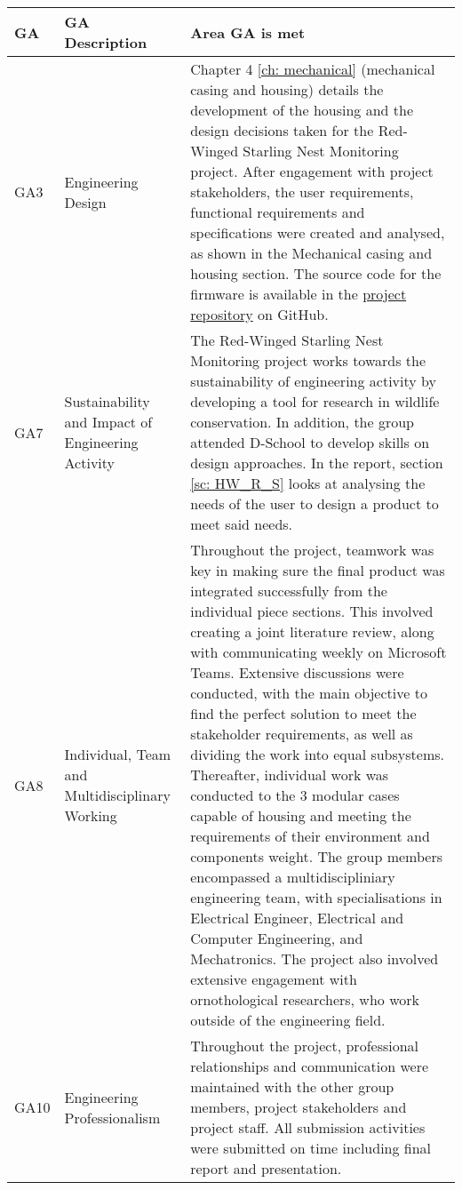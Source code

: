\documentclass[class=report,11pt,crop=false]{standalone}
\begin{document}
\centering
\begin{tabularx}{\textwidth}{|p{} p{} X|}

    \hline
    \textbf{GA} & \textbf{GA Description} & \textbf{Area GA is met} \\ \hline

    GA3 & Engineering Design & Chapter 4  \ref{ch: mechanical} (mechanical casing and housing) details the development of the housing and the design decisions taken for the Red-Winged Starling Nest Monitoring project. After engagement with project stakeholders, the user requirements, functional requirements and specifications were created and analysed, as shown in the Mechanical casing and housing section.   The source code for the firmware is available in the \href{https://github.com/rothdu/EEE4113F-Group13-2024}{project repository} on GitHub.   \\ \hline

    GA7 & Sustainability and Impact of Engineering Activity & The Red-Winged Starling Nest Monitoring project works towards the sustainability of engineering activity by developing a tool for research in wildlife conservation.  In addition, the group attended D-School to develop skills on design approaches. In the report, section \ref{sc: HW_R_S} looks at analysing the needs of the user to design a product to meet said needs. \\ \hline

    GA8 & Individual, Team and Multidisciplinary Working & Throughout the project, teamwork was key in making sure the final product was integrated successfully from the individual piece sections. This involved creating a joint literature review, along with communicating weekly on Microsoft Teams. Extensive discussions were conducted, with the main objective to find the perfect solution to meet the stakeholder requirements, as well as dividing the work into equal subsystems. Thereafter, individual work was conducted to the 3 modular cases capable of housing and meeting the requirements of their environment and components weight. The group members encompassed a multidiscipliniary engineering team, with specialisations in Electrical Engineer, Electrical and Computer Engineering, and Mechatronics. The project also involved extensive engagement with ornothological researchers, who work outside of the engineering field. \\ \hline

    GA10 & Engineering Professionalism & Throughout the project, professional relationships and communication were maintained with the other group members, project stakeholders and project staff. All submission activities were submitted on time including final report and presentation.  \\ \hline


\end{tabularx}
\raggedright
\end{document}
